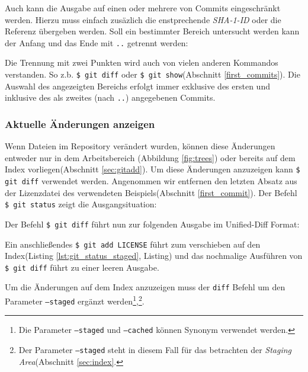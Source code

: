 

Auch kann die Ausgabe auf einen oder mehrere von Commits eingeschränkt werden.
Hierzu muss einfach zusäzlich die enstprechende \textit{SHA-1-ID} oder die
Referenz übergeben werden. Soll ein bestimmter Bereich untersucht werden kann
der Anfang und das Ende mit \texttt{..} getrennt werden:



Die Trennung mit zwei Punkten wird auch von vielen anderen Kommandos
verstanden. So z.b. \texttt{\$ git diff} oder \texttt{\$ git show}(Abschnitt
\ref{first_commits}). Die Auswahl des angezeigten Bereichs erfolgt immer
exklusive des ersten und inklusive des als zweites (nach \texttt{..}) angegebenen
Commits.\cite[45-48]{gitosp}

\subsubsection{Aktuelle Änderungen anzeigen}\label{sec:gitdiff}
Wenn Dateien im Repository verändert wurden, können diese Änderungen entweder
nur in dem Arbeitsbereich (Abbildung \ref{fig:trees}) oder bereits auf dem
Index vorliegen(Abschnitt \ref{sec:gitadd}). Um diese Änderungen anzuzeigen
kann \texttt{\$ git diff} verwendet werden. Angenommen wir entfernen den
letzten Absatz aus der Lizenzdatei des verwendeten Beispiels(Abschnitt
\ref{first_commit}). Der Befehl \texttt{\$ git status} zeigt die Ausgangsituation:



Der Befehl \texttt{\$ git diff} führt nun zur folgenden Ausgabe im Unified-Diff
Format:



Ein anschließendes \texttt{\$ git add LICENSE} führt zum verschieben auf den
Index(Listing \ref{lst:git_status_staged}, Listing) und das nochmalige
Ausführen von \texttt{\$ git diff} führt zu einer leeren Ausgabe.



Um die Änderungen auf dem Index anzuzeigen muss der \texttt{diff} Befehl um
den Parameter \texttt{--staged} ergänzt werden\footnote{Die Parameter \texttt{--staged} und
\texttt{--cached} können Synonym verwendet werden.},\footnote{Der Parameter
\texttt{--staged} steht in diesem Fall für das betrachten der \textit{Staging
Area}(Abschnitt \ref{sec:index}.}.\cite[26-29]{progit}
